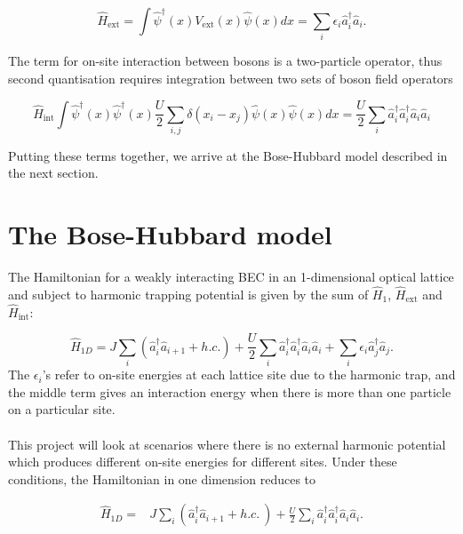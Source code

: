 \documentclass[a4paper,10pt]{article}
\begin{document}
\begin{equation}
 \hat{H}_{\text{ext}}=\int  \hat{\psi}^{\dagger}(x) V_{\text{ext}}(x)  \hat{\psi}(x)dx = \sum_i \epsilon_i \hat{a}_i^{\dagger}\hat{a}_i.
\end{equation}

The term for on-site interaction between bosons is a two-particle operator, thus second quantisation requires integration between two sets of boson field operators 

\begin{equation}
\hat{H}_{\text{int}} \int  \hat{\psi}^{\dagger}(x)\hat{\psi}^{\dagger}(x) \frac{U}{2}\sum_{i,j}\delta(x_{i}-x_{j})  \hat{\psi}(x) \hat{\psi}(x) dx = \frac{U}{2}\sum_i \hat{a}_i^{\dagger}\hat{a}_i^{\dagger}\hat{a}_i\hat{a}_i
\end{equation}


Putting these terms together, we arrive at the Bose-Hubbard model described in the next section.
\newpage



\newpage
\section{The Bose-Hubbard model}

The Hamiltonian for a weakly interacting BEC in an 1-dimensional optical lattice and subject to harmonic trapping potential is given by the sum of $\hat{H}_1$, $\hat{H}_{\text{ext}}$ and $\hat{H}_{\text{int}}$:

\begin{equation}
 \hat{H}_{1D}=J\sum_{i}(\hat{a}^\dagger_{i}\hat{a}_{i+1}+h.c.)+\frac{U}{2}\sum_{i}\hat{a}^\dagger_{i}\hat{a}^\dagger_{i}\hat{a}_{i}\hat{a}_{i}+\sum_{i}{\epsilon_i}\hat{a}^\dagger_{j}\hat{a}_{j}.
\end{equation}
The $\epsilon_i$'s refer to on-site energies at each lattice site due to the harmonic trap, and the middle term gives an interaction energy when there is more than one particle 
on a particular site.
\\\\
This project will look at scenarios where there is no external harmonic potential which produces different on-site energies for different sites.  
Under these conditions, the Hamiltonian in one dimension reduces to

\begin{equation}
\begin{align*}
\hat{H}_{1D}=&J\sum_{i}(\hat{a}^\dagger_{i}\hat{a}_{i+1}+h.c.\ ) +\frac{U}{2}\sum_{i}\hat{a}^\dagger_{i}\hat{a}^\dagger_{i}\hat{a}_{i}\hat{a}_{i}.
\end{align*}
\end{equation}
\end{document}
